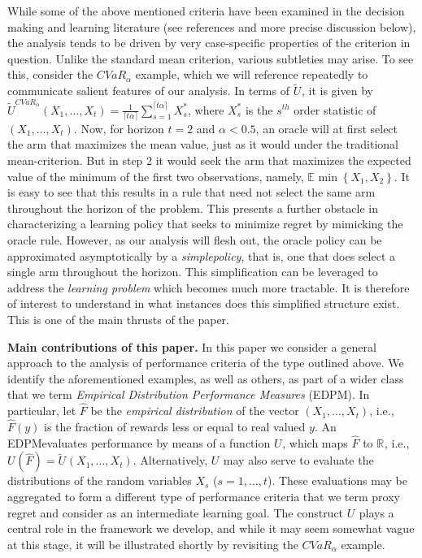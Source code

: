 \documentclass[final,12pt]{colt2018}
\newcommand{\brc}[1]{\left\lbrace #1 \right\rbrace}
\newcommand{\ceil}[1]{\lceil #1 \rceil}
\newcommand{\EE}[2][]{\mathbb{E}_{#1}{#2}}
\newcommand{\RR}[1][]{\mathds{R}^{#1}}
\newcommand{\simple}{simple}
\newcommand{\CVAR}[1][\alpha]{CVaR_{#1}}
\newcommand{\EDRMabbrv}{EDPM}
\newcommand{\Rbase}[1][]{\tilde{U}^{#1}}
\newcommand{\RHat}[1][]{{U}^{#1}}
\begin{document}
	While some of the above mentioned criteria have been examined in the decision making and learning literature (see  references and more precise discussion below), the analysis tends to be driven by very case-specific properties of the criterion in question. Unlike the standard mean criterion, various subtleties may arise. To see this, consider the $\CVAR$ example, which we will reference repeatedly to communicate salient features of our analysis. In terms of $\Rbase$, it is given by $\Rbase[\CVAR](X_1,\ldots, X_t) = \frac{1}{\ceil{t\alpha}} \sum_{s=1}^{\ceil{t\alpha}}X_s^*$, where $X_s^*$ is the $s^{th}$ order statistic of $(X_1,\ldots,X_t)$. Now, for horizon $t=2$ and $\alpha < 0.5$, an oracle will at first select the arm that maximizes the mean value, just as it would under the traditional mean-criterion. But in step 2 it would seek the arm that maximizes the expected value of the minimum of the first two observations, namely, $\EE{\min\brc{X_1,X_2}}$. It is easy to see that this results in a rule that need not select the same arm throughout the horizon of the problem. This presents a further obstacle in characterizing a learning policy that seeks to minimize regret by mimicking the oracle rule. However, as our analysis will flesh out, the oracle policy can be approximated asymptotically by a {\it \simple\space policy}, that is, one that does select a single arm throughout the horizon. This simplification can be leveraged to address the  {\it learning problem} which becomes much more tractable. It is therefore of interest to understand in what instances  does  this simplified structure exist. This is one of the main thrusts of the paper. 
	
	\textbf{Main contributions of this paper.}
	In this paper we consider a general approach to the analysis of performance criteria of the type outlined above. We identify the aforementioned examples, as well as others, as part of a wider class that we term \emph{Empirical Distribution Performance Measures} (\EDRMabbrv). In particular, let $\hat{F}$ be the \emph{empirical distribution} of the vector $(X_1,\ldots,X_t)$, i.e., $\hat{F}(y)$ is the fraction of rewards less or equal to real valued $y$. An \EDRMabbrv\space evaluates performance by means of a function $\RHat$, which maps $\hat{F}$ to $\RR$, i.e., $\RHat(\hat{F}) = \Rbase(X_1,\ldots,X_t)$. Alternatively, $\RHat$ may also serve to evaluate the distributions of the random variables $X_s$ ($s=1,\ldots,t$). These evaluations may be aggregated to form a different type of performance criteria that we term proxy regret and consider as an intermediate learning goal. The construct $\RHat$ plays a central role in the framework we develop, and while it may seem somewhat vague at this stage, it will be illustrated shortly by revisiting the $\CVAR$ example. 
	
\end{document}
